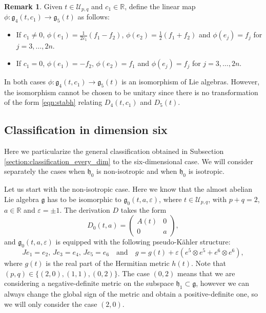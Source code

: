 \documentclass{article}
\theoremstyle{definition}
\newtheorem{remark}[theorem]{Remark}
\newcommand{\R}{\mathbb{R}}
\newcommand{\frg}{\mathfrak{g}}
\newcommand{\frh}{\mathfrak{h}}
\newcommand{\lie}[1]{\mathfrak{#1}}
\newcommand{\g}{\lie g}
\begin{document}
\begin{remark}
    Given $t\in\mathcal{U}_{p,q}$ and $c_1\in\R$, define the linear map $\phi\colon\frg_{4}(t,c_1)\to\frg_{5}(t)$ as follows: \begin{itemize}
        \item If $c_1\neq0$, $\phi(e_1)=\frac{1}{2c_1}(f_1-f_2)$, $\phi(e_2)=\frac{1}{2}(f_1+f_2)$ and $\phi(e_j)=f_j$ for $j=3,\ldots,2n$.
        \item If $c_1=0$, $\phi(e_1)=-f_2$, $\phi(e_2)=f_1$ and $\phi(e_j)=f_j$ for $j=3,\ldots,2n$.
    \end{itemize} In both cases $\phi\colon\frg_{4}(t,c_1)\to\frg_{5}(t)$ is an isomorphism of Lie algebras. However, the isomorphism cannot be chosen to be unitary since there is no transformation of the form \eqref{eqn:stabh} relating $D_4(t,c_1)$ and $D_5(t)$.
\end{remark}

\subsection{Classification in dimension six}\label{section:6d_classification}

Here we particularize the general classification obtained in Subsection \ref{section:classification_every_dim} to the six-dimensional case. We will consider separately the cases when $\frh_0$ is non-isotropic and when $\frh_0$ is isotropic.\medskip

Let us start with the non-isotropic case. Here we know that the almost abelian Lie algebra $\frg$ has to be isomorphic to $\g_0(t,a,\varepsilon)$, where $t\in\mathcal{U}_{p,q}$, with $p+q=2$, $a\in\R$ and $\varepsilon=\pm1$. The derivation $D$ takes the form $$D_0(t,a)=\begin{pmatrix}
    A(t)&0\\
    0&a
\end{pmatrix},$$ and $\frg_0(t,a,\varepsilon)$ is equipped with the following pseudo-Kähler structure: \begin{equation}\label{eqn:Jgnonisotropic6}
    Je_1=e_2,\,Je_3=e_4,\,Je_5=e_6\quad\text{and}\quad g=g(t)+\varepsilon(e^5\otimes e^5+e^6\otimes e^6),
\end{equation} where $g(t)$ is the real part of the Hermitian metric $h(t)$. Note that $(p,q)\in\{(2,0),(1,1),(0,2)\}$. The case $(0,2)$ means that we are considering a negative-definite metric on the subspace $\frh_1\subset\frg$, however we can always change the global sign of the metric and obtain a positive-definite one, so we will only consider the case $(2,0)$.\medskip
\end{document}
